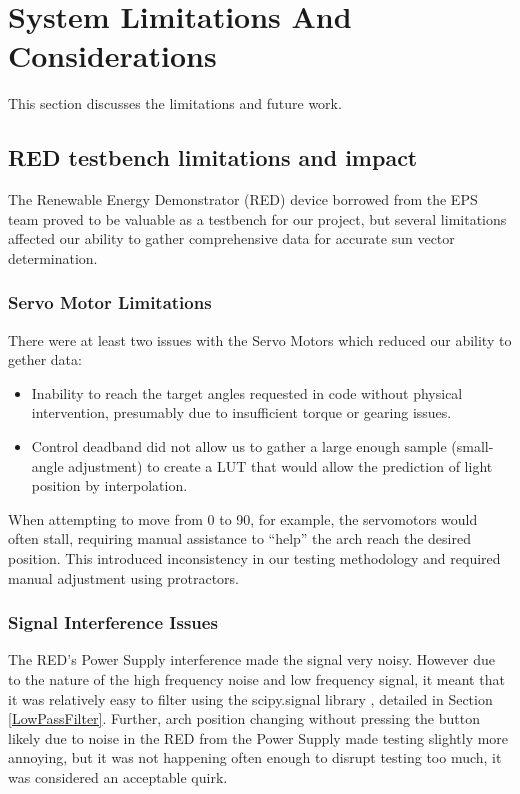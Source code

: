 \section{System Limitations And Considerations}
This section discusses the limitations and future work.
\subsection{\acf{RED} testbench limitations and impact}
The Renewable Energy Demonstrator (RED) device borrowed from the EPS team \cite{RefWorks:shopov2022renewable} proved to be valuable as a testbench for our project, but several limitations affected our ability to gather comprehensive data for accurate sun vector determination.
\subsubsection{Servo Motor Limitations}
There were at least two issues with the Servo Motors which reduced our ability to gether data:
\begin{itemize}
    \item Inability to reach the target angles requested in code without physical intervention, presumably due to insufficient torque or gearing issues.
    \item Control deadband did not allow us to gather a large enough sample (small-angle adjustment) to create a \ac{LUT} that would allow the prediction of light position by interpolation.
\end{itemize}

When attempting to move from 0\textdegree{} to 90\textdegree{}, for example, the servomotors would often stall, requiring manual assistance to ``help'' the arch reach the desired position. This introduced inconsistency in our testing methodology and required manual adjustment using protractors.

\subsubsection{Signal Interference Issues}

The \ac{RED}'s Power Supply interference made the signal very noisy. However due to the nature of the high frequency noise and low frequency signal, it meant that it was relatively easy to filter using the scipy.signal library \cite{RefWorks:butter}, detailed in Section \ref{LowPassFilter}. Further, arch position changing without pressing the button likely due to noise in the \ac{RED} from the Power Supply made testing slightly more annoying, but it was not happening often enough to disrupt testing too much, it was considered an acceptable quirk.

